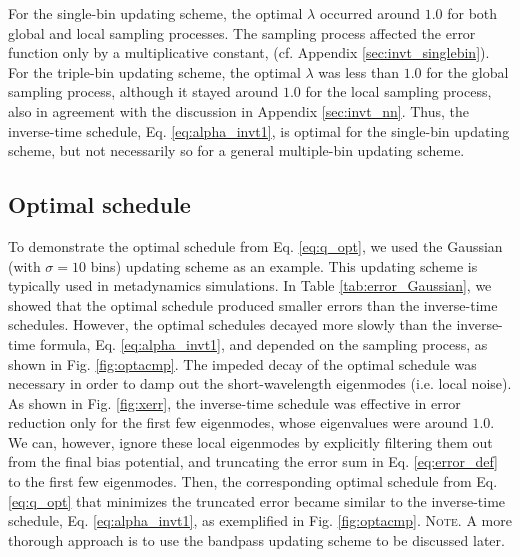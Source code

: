 \documentclass[reprint, superscriptaddress, floatfix]{revtex4-1}
\newcommand{\note}[1]{{\color{DarkGreen}\footnotesize \textsc{Note.} #1}}
\begin{document}
For the single-bin updating scheme,
the optimal $\lambda$ occurred around $1.0$
for both global and local sampling processes.
%
The sampling process affected the error function
only by a multiplicative constant,
(cf. Appendix \ref{sec:invt_singlebin}).
%
For the triple-bin updating scheme,
the optimal $\lambda$ was less than $1.0$
for the global sampling process,
although it stayed around $1.0$
for the local sampling process,
also in agreement with the discussion
in Appendix \ref{sec:invt_nn}.
%
Thus, the inverse-time schedule,
Eq. \eqref{eq:alpha_invt1},
is optimal for the single-bin updating scheme,
but not necessarily so for a general multiple-bin updating scheme.
%




\subsection{\label{sec:results_optschedule}
Optimal schedule}



To demonstrate the optimal schedule from Eq. \eqref{eq:q_opt},
we used the Gaussian (with $\sigma = 10$ bins) updating scheme
as an example.
%
This updating scheme is typically used in metadynamics simulations.
%
In Table \ref{tab:error_Gaussian},
we showed that the optimal schedule
produced smaller errors than
the inverse-time schedules.
%
However, the optimal schedules
decayed more slowly than
the inverse-time formula, Eq. \eqref{eq:alpha_invt1},
and depended on the sampling process,
as shown in Fig. \ref{fig:optacmp}.
%
The impeded decay of the optimal schedule
was necessary in order to
damp out the short-wavelength eigenmodes
(i.e. local noise).
%
As shown in Fig. \ref{fig:xerr},
the inverse-time schedule was effective in error reduction
only for the first few eigenmodes,
whose eigenvalues were around $1.0$.
%
We can, however, ignore these local eigenmodes
by explicitly filtering them out from the final bias potential,
and truncating the error sum in Eq. \eqref{eq:error_def}
to the first few eigenmodes.
%
Then, the corresponding optimal schedule
from Eq. \eqref{eq:q_opt} that minimizes the truncated error
became similar to the inverse-time schedule,
Eq. \eqref{eq:alpha_invt1},
as exemplified in Fig. \ref{fig:optacmp}.
%
\note{A more thorough approach is
to use the bandpass updating scheme
to be discussed later.
}
\end{document}
